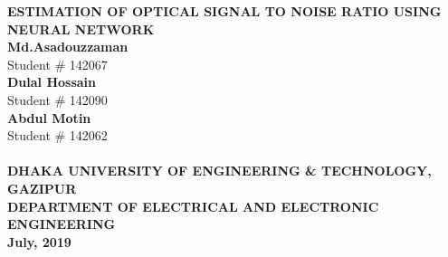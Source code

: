 \documentclass[12pt]{report}
\begin{document}
	\begin{titlepage}
		\begin{center}
			\LARGE {\bfseries {ESTIMATION OF OPTICAL SIGNAL TO NOISE RATIO USING NEURAL NETWORK}}\\
			\vspace{2cm}
			{\normalsize 
			\textbf{Md.Asadouzzaman}\\
			Student \# 142067\\
			\textbf{Dulal Hossain}\\
			Student \# 142090\\
			\textbf{Abdul Motin}\\
			Student \# 142062\\}
		\vspace{4cm}
			\\
			\vspace{4cm}
			{\fontsize{14}{0} \bfseries {DHAKA UNIVERSITY OF ENGINEERING \& TECHNOLOGY, GAZIPUR}}\\
			{\fontsize{12}{0} \bfseries {DEPARTMENT OF ELECTRICAL AND ELECTRONIC ENGINEERING}}\\
			{\fontsize{12}{0} \textbf{July, 2019}}
		\end{center}
	\end{titlepage}
\end{document}
